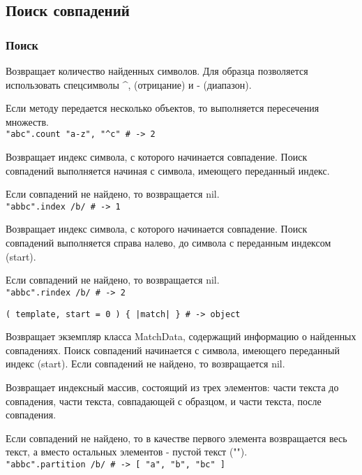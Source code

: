 \subsection*{Поиск совпадений}

\subsubsection*{Поиск}

\begin{methodlist}
  Возвращает количество найденных символов. Для образца позволяется использовать спецсимволы \textasciicircum\-, (отрицание) и - (диапазон). 

  Если методу передается несколько объектов, то выполняется пересечения множеств.
  \\\verb!"abc".count "a-z", "^c" # -> 2!

  Возвращает индекс символа, с которого начинается совпадение. Поиск совпадений выполняется начиная с символа, имеющего переданный индекс.

  Если совпадений не найдено, то возвращается nil.
  \\\verb!"abbc".index /b/ # -> 1!

  Возвращает индекс символа, с которого начинается совпадение. Поиск совпадений выполняется справа налево, до символа с переданным индексом (start).

  Если совпадений не найдено, то возвращается nil.
  \\\verb!"abbc".rindex /b/ # -> 2!

  \verb!( template, start = 0 ) { |match| } # -> object!

  Возвращает экземпляр класса MatchData, содержащий информацию о найденных совпадениях. Поиск совпадений начинается с символа, имеющего переданный индекс (start). Если совпадений не найдено, то возвращается nil.

  Возвращает индексный массив, состоящий из трех элементов: части текста до совпадения, части текста, совпадающей с образцом, и части текста, после совпадения.

  Если совпадений не найдено, то в качестве первого элемента возвращается весь текст, а вместо остальных элементов - пустой текст ("").
  \\\verb!"abbc".partition /b/ # -> [ "a", "b", "bc" ]!


\end{methodlist}
